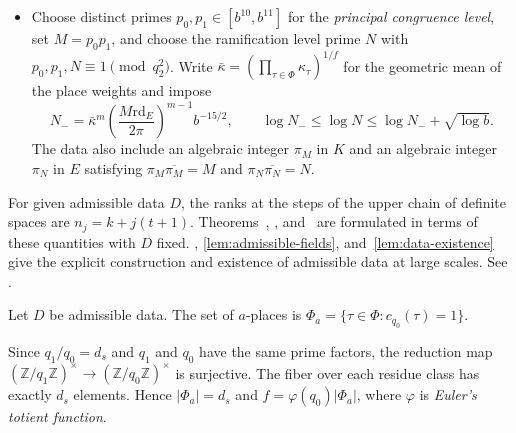 \begin{definition}
\begin{itemize}
\begin{equation}
\label{eq:admissible-place-weights}
\end{equation}
Since $x_1\mid b$, both possible weights are integers.
\item Choose distinct primes $p_0,p_1\in[b^{10},b^{11}]$ for the \emph{principal congruence level}, set $M=p_0p_1$, and choose the ramification level prime $N$ with $p_0,p_1,N\equiv1\pmod{q_2^2}$. Write $\bar\kappa=(\prod_{\tau\in\Phi}\kappa_\tau)^{1/f}$ for the geometric mean of the place weights and impose
\[
 N_-=\bar\kappa^m\left(\frac{M\mathrm{rd}_E}{2\pi}\right)^{m-1}b^{-15/2},
 \qquad \log N_-\le\log N\le\log N_-+\sqrt{\log b}.
\]
The data also include an algebraic integer $\pi_M$ in $K$ and an algebraic integer $\pi_N$ in $E$ satisfying
$\pi_M\overline{\pi_M}=M$ and $\pi_N\overline{\pi_N}=N$.
\end{itemize}
\end{definition}

For given admissible data $D$, the ranks at the steps of the upper chain of definite spaces are $n_j=k+j(t+1)$. Theorems~, , and~ are formulated in terms of these quantities with $D$ fixed. , \ref{lem:admissible-fields}, and~\ref{lem:data-existence} give the explicit construction and existence of admissible data at large scales. See .

\begin{definition}[$a$-places]
\label{def:a-places}
\emitthmsource
Let $D$ be admissible data. The set of $a$-places is $\Phi_a=\{\tau\in\Phi:c_{q_0}(\tau)=1\}$.
\end{definition}

Since $q_1/q_0=d_s$ and $q_1$ and $q_0$ have the same prime factors, the reduction map $(\mathbb Z/q_1\mathbb Z)^\times\to(\mathbb Z/q_0\mathbb Z)^\times$ is surjective. The fiber over each residue class has exactly $d_s$ elements. Hence $|\Phi_a|=d_s$ and $f=\varphi(q_0)|\Phi_a|$, where $\varphi$ is \emph{Euler's totient function}.

